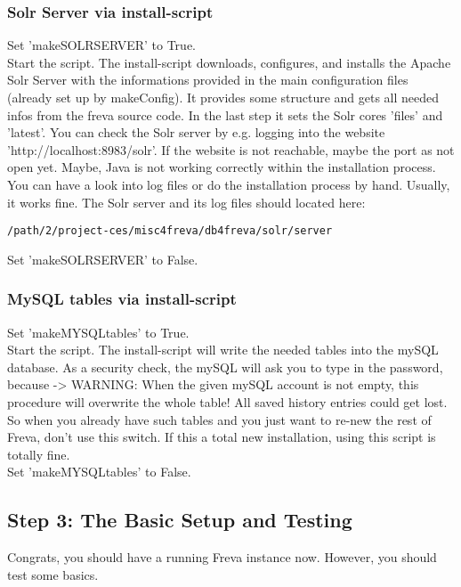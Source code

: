 \documentclass[a4paper,11pt]{ltxdoc}
\begin{document}
\subsubsection{Solr Server via install-script}
Set 'makeSOLRSERVER' to True. \\
Start the script. The install-script downloads, configures, and installs the Apache Solr Server with the informations provided in the main configuration files (already set up by makeConfig). It provides some structure and gets all needed infos from the freva source code. In the last step it sets the Solr cores 'files' and 'latest'. You can check the Solr server by e.g. logging into the website 'http://localhost:8983/solr'. If the website is not reachable, maybe the port as not open yet. Maybe, Java is not working correctly within the installation process. You can have a look into log files or do the installation process by hand. Usually, it works fine. The Solr server and its log files should located here:
\begin{verbatim}/path/2/project-ces/misc4freva/db4freva/solr/server \end{verbatim}
Set 'makeSOLRSERVER' to False.
\subsubsection{MySQL tables via install-script}
Set 'makeMYSQLtables' to True. \\
Start the script. The install-script will write the needed tables into the mySQL database. As a security check, the mySQL will ask you to type in the password, because ->
WARNING: When the given mySQL account is not empty, this procedure will overwrite the whole table! All saved history entries could get lost. So when you already have such tables and you just want to re-new the rest of Freva, don't use this switch. If this a total new installation, using this script is totally fine. \\
Set 'makeMYSQLtables' to False.
\subsection{Step 3: The Basic Setup and Testing}
Congrats, you should have a running Freva instance now. However, you should test some basics.
\end{document}
